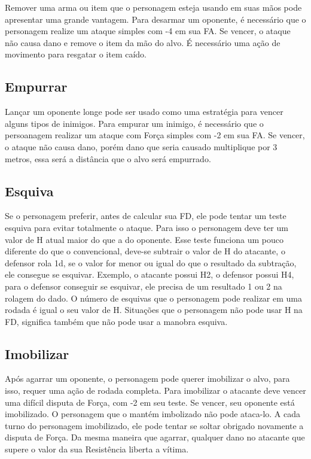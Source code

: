 Remover uma arma ou item que o personagem esteja usando em suas mãos pode apresentar uma grande vantagem. Para desarmar um oponente, é necessário que o personagem realize um ataque simples com -4 em sua FA. Se vencer, o ataque não causa dano e remove o item da mão do alvo. É necessário uma ação de movimento para resgatar o item caído.

\subsection{Empurrar}

Lançar um oponente longe pode ser usado como uma estratégia para vencer alguns tipos de inimigos. Para empurar um inimigo, é necessário que o persoanagem realizar um ataque com Força simples com -2 em sua FA. Se vencer, o ataque não causa dano, porém dano que seria causado multiplique por 3 metros, essa será a distância que o alvo será empurrado. 

\subsection{Esquiva}

Se o personagem preferir, antes de calcular sua FD, ele pode tentar um teste esquiva para evitar totalmente o ataque. Para isso o personagem deve ter um valor de H atual maior do que a do oponente. Esse teste funciona um pouco diferente do que o convencional, deve-se subtrair o valor de H do atacante, o defensor rola 1d, se o valor for menor ou igual do que o resultado da subtração, ele consegue se esquivar. Exemplo, o atacante possui H2, o defensor possui H4, para o defensor conseguir se esquivar, ele precisa de um resultado 1 ou 2 na rolagem do dado. O número de esquivas que o personagem pode realizar em uma rodada é igual o seu valor de H. Situações que o personagem não pode usar H na FD, significa também que não pode usar a manobra esquiva.

\subsection{Imobilizar}

Após agarrar um oponente, o personagem pode querer imobilizar o alvo, para isso, requer uma ação de rodada completa. Para imobilizar o atacante deve vencer uma difícil disputa de Força, com -2 em seu teste. Se vencer, seu oponente está imobilizado. O personagem que o mantém imbolizado não pode ataca-lo. A cada turno do personagem imobilizado, ele pode tentar se soltar obrigado novamente a disputa de Força. Da mesma maneira que agarrar, qualquer dano no atacante que supere o valor da sua Resistência liberta a vítima.

